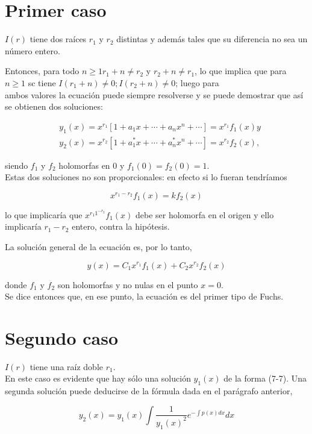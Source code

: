 \documentclass[10pt]{article}
\theoremstyle{plain}
\theoremstyle{definition}
\theoremstyle{remark}
\begin{document}
\section*{Primer caso}
$I(r)$ tiene dos raíces $r_{1}$ y $r_{2}$ distintas y además tales que su diferencia no sea un número entero.

Entonces, para todo $n \geqslant 1 r_{1}+n \neq r_{2}$ y $r_{2}+n \neq r_{1}$, lo que implica que para $n \geqslant 1$ sc tiene $I\left(r_{1}+n\right) \neq 0 ; I\left(r_{2}+n\right) \neq 0$; luego para\\
ambos valores la ecuación puede siempre resolverse y se puede demostrar que así se obtienen dos soluciones:

$$
\begin{aligned}
& y_{1}(x)=x^{r_{1}}\left[1+a_{1} x+\cdots+a_{n} x^{n}+\cdots\right]=x^{r_{1}} f_{1}(x) y \\
& y_{2}(x)=x^{r_{2}}\left[1+a_{1}^{*} x+\cdots+a_{n}^{*} x^{n}+\cdots\right]=x^{r_{2}} f_{2}(x),
\end{aligned}
$$

siendo $f_{1}$ y $f_{2}$ holomorfas en 0 y $f_{1}(0)=f_{2}(0)=1$.\\
Estas dos soluciones no son proporcionales: en efecto si lo fueran tendríamos

$$
x^{r_{1}-r_{2}} f_{1}(x)=k f_{2}(x)
$$

lo que implicaría que $x^{r_{1} 1^{-r_{2}}} f_{1}(x)$ debe ser holomorfa en el origen y ello implicaría $r_{1}-r_{2}$ entero, contra la hipótesis.

La solución general de la ecuación es, por lo tanto,

$$
y(x)=C_{1} x^{r_{1}} f_{1}(x)+C_{2} x^{r_{2}} f_{2}(x)
$$

donde $f_{1}$ y $f_{2}$ son holomorfas y no nulas en el punto $x=0$.\\
Se dice entonces que, en ese punto, la ecuación es del primer tipo de Fuchs.

\section*{Segundo caso}
$I(r)$ tiene una raíz doble $r_{1}$.\\
En este caso es evidente que hay sólo una solución $y_{1}(x)$ de la forma (7-7). Una segunda solución puede deducirse de la fórmula dada en el parágrafo anterior,

$$
y_{2}(x)=y_{1}(x) \int \frac{1}{y_{1}(x)^{2}} e^{-\int p(x) d x} d x
$$
\end{document}
